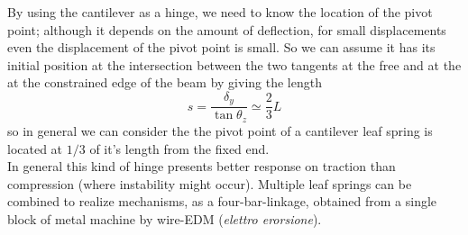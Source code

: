 	By using the cantilever as a hinge, we need to know the location of the pivot point; although it depends on the amount of deflection, for small displacements even the displacement of the pivot point is small. So we can assume it has its initial position at the intersection between the two tangents at the free and at the at the constrained edge of the beam by giving the length
	\[ s = \frac{\delta_y}{\tan\theta_z} \simeq \frac 2 3 L \]
	so in general we can consider the the pivot point of a cantilever leaf spring is located at $1/3$ of it's length from the fixed end. \\
	In general this kind of hinge presents better response on traction than compression (where instability might occur). Multiple leaf springs can be combined to realize mechanisms, as a four-bar-linkage, obtained from a single block of metal machine by wire-EDM (\textit{elettro erorsione}).
	
	
	
	
	
	
	
	
	
	
	
	
	
	
	
	
	
	
	
	
	
	
	
	
	
	
	
	
	
	
	
	
	
	
	
	
	
	